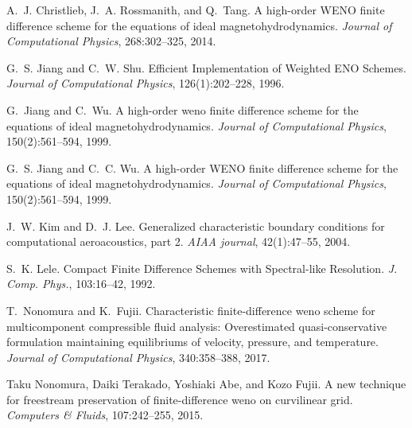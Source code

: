 
\begin{DoxyDescription}
\item[\label{_CITEREF_Christlieb2014:mhd}%
\mbox{[}1\mbox{]}]A.~J. Christlieb, J.~A. Rossmanith, and Q.~Tang. A high-\/order W\+E\+NO finite difference scheme for the equations of ideal magnetohydrodynamics. {\itshape Journal of Computational Physics}, 268\+:302--325, 2014.


\item[\label{_CITEREF_Jiang1996:fifth}%
\mbox{[}2\mbox{]}]G.~S. Jiang and C.~W. Shu. Efficient Implementation of Weighted E\+NO Schemes. {\itshape Journal of Computational Physics}, 126(1)\+:202--228, 1996.


\item[\label{_CITEREF_jiang1999high}%
\mbox{[}3\mbox{]}]G.~Jiang and C.~Wu. A high-\/order weno finite difference scheme for the equations of ideal magnetohydrodynamics. {\itshape Journal of Computational Physics}, 150(2)\+:561--594, 1999.


\item[\label{_CITEREF_Jiang1999:mhd}%
\mbox{[}4\mbox{]}]G.~S. Jiang and C.~C. Wu. A high-\/order W\+E\+NO finite difference scheme for the equations of ideal magnetohydrodynamics. {\itshape Journal of Computational Physics}, 150(2)\+:561--594, 1999.


\item[\label{_CITEREF_kim2004generalized}%
\mbox{[}5\mbox{]}]J.~W. Kim and D.~J. Lee. Generalized characteristic boundary conditions for computational aeroacoustics, part 2. {\itshape A\+I\+AA journal}, 42(1)\+:47--55, 2004.


\item[\label{_CITEREF_lele:1992}%
\mbox{[}6\mbox{]}]S.~K. Lele. Compact Finite Difference Schemes with Spectral-\/like Resolution. {\itshape J. Comp. Phys.}, 103\+:16--42, 1992.


\item[\label{_CITEREF_nonomura2017characteristic}%
\mbox{[}7\mbox{]}]T.~Nonomura and K.~Fujii. Characteristic finite-\/difference weno scheme for multicomponent compressible fluid analysis\+: Overestimated quasi-\/conservative formulation maintaining equilibriums of velocity, pressure, and temperature. {\itshape Journal of Computational Physics}, 340\+:358--388, 2017.


\item[\label{_CITEREF_nonomura2015new}%
\mbox{[}8\mbox{]}]Taku Nonomura, Daiki Terakado, Yoshiaki Abe, and Kozo Fujii. A new technique for freestream preservation of finite-\/difference weno on curvilinear grid. {\itshape Computers \& Fluids}, 107\+:242--255, 2015.



\end{DoxyDescription}
